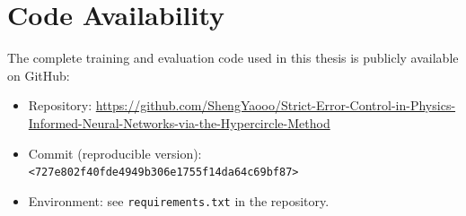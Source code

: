 \documentclass[12pt, a4paper]{article}
\begin{document}

\appendix

\section{Code Availability}
The complete training and evaluation code used in this thesis is publicly available on GitHub:

\begin{itemize}
  \item Repository: \url{https://github.com/ShengYaooo/Strict-Error-Control-in-Physics-Informed-Neural-Networks-via-the-Hypercircle-Method}
  \item Commit (reproducible version): \texttt{<727e802f40fde4949b306e1755f14da64c69bf87>}
  \item Environment: see \texttt{requirements.txt} in the repository.
\end{itemize}
\end{document}
